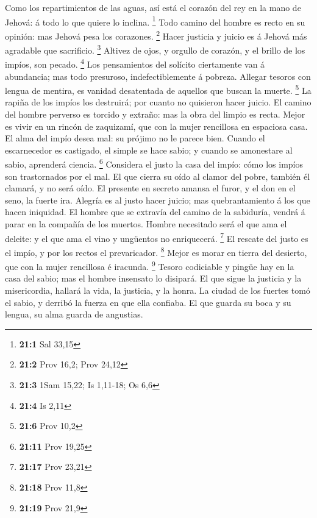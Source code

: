  Como los repartimientos de las aguas, así está el corazón
del rey en la mano de Jehová: á todo lo que quiere lo inclina.
\footnote{\textbf{21:1} Sal 33,15}  Todo camino del hombre
es recto en su opinión: mas Jehová pesa los corazones. \footnote{\textbf{21:2}
  Prov 16,2; Prov 24,12}  Hacer justicia y juicio es á
Jehová más agradable que sacrificio. \footnote{\textbf{21:3} 1Sam 15,22;
  Is 1,11-18; Os 6,6}  Altivez de ojos, y orgullo de
corazón, y el brillo de los impíos, son pecado. \footnote{\textbf{21:4}
  Is 2,11}  Los pensamientos del solícito ciertamente van á
abundancia; mas todo presuroso, indefectiblemente á pobreza.
 Allegar tesoros con lengua de mentira, es vanidad
desatentada de aquellos que buscan la muerte. \footnote{\textbf{21:6}
  Prov 10,2}  La rapiña de los impíos los destruirá; por
cuanto no quisieron hacer juicio.  El camino del hombre
perverso es torcido y extraño: mas la obra del limpio es recta.
 Mejor es vivir en un rincón de zaquizamí, que con la mujer
rencillosa en espaciosa casa.  El alma del impío desea mal:
su prójimo no le parece bien.  Cuando el escarnecedor es
castigado, el simple se hace sabio; y cuando se amonestare al sabio,
aprenderá ciencia. \footnote{\textbf{21:11} Prov 19,25} 
Considera el justo la casa del impío: cómo los impíos son trastornados
por el mal.  El que cierra su oído al clamor del pobre,
también él clamará, y no será oído.  El presente en secreto
amansa el furor, y el don en el seno, la fuerte ira. 
Alegría es al justo hacer juicio; mas quebrantamiento á los que hacen
iniquidad.  El hombre que se extravía del camino de la
sabiduría, vendrá á parar en la compañía de los muertos. 
Hombre necesitado será el que ama el deleite: y el que ama el vino y
ungüentos no enriquecerá. \footnote{\textbf{21:17} Prov 23,21}
 El rescate del justo es el impío, y por los rectos el
prevaricador. \footnote{\textbf{21:18} Prov 11,8}  Mejor es
morar en tierra del desierto, que con la mujer rencillosa é iracunda.
\footnote{\textbf{21:19} Prov 21,9}  Tesoro codiciable y
pingüe hay en la casa del sabio; mas el hombre insensato lo disipará.
 El que sigue la justicia y la misericordia, hallará la
vida, la justicia, y la honra.  La ciudad de los fuertes
tomó el sabio, y derribó la fuerza en que ella confiaba. 
El que guarda su boca y su lengua, su alma guarda de angustias.
